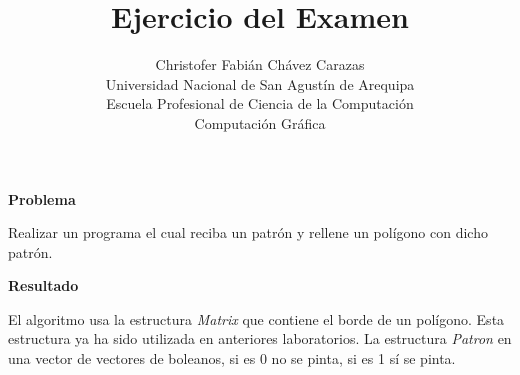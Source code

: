 \documentclass[a4paper,12pt]{article}
\begin{document}
\title{Ejercicio del Examen}
\author{
Christofer Fabián Chávez Carazas \\
\small{Universidad Nacional de San Agustín de Arequipa} \\
\small{Escuela Profesional de Ciencia de la Computación} \\
\small{Computación Gráfica}
}
\date{}

\maketitle

\begin{large}
 \textbf{Problema}
\end{large}

Realizar un programa el cual reciba un patrón y rellene un polígono con dicho patrón.

\begin{large}
 \textbf{Resultado}
\end{large}

El algoritmo usa la estructura \textit{Matrix} que contiene el borde de un polígono. Esta estructura ya ha sido utilizada en anteriores laboratorios.
La estructura \textit{Patron} en una vector de vectores de boleanos, si es 0 no se pinta, si es 1 sí se pinta.
\end{document}
